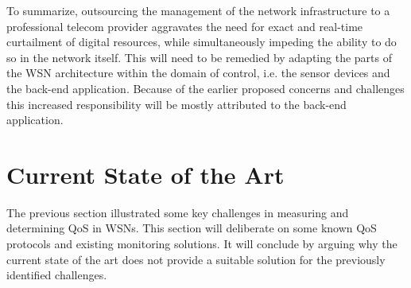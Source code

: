 To summarize, outsourcing the management of the network infrastructure to a professional telecom provider aggravates the need for exact and real-time curtailment of digital resources, while simultaneously impeding the ability to do so in the network itself. This will need to be remedied by adapting the parts of the WSN architecture within the domain of control, i.e. the sensor devices and the back-end application. Because of the earlier proposed concerns and challenges this increased responsibility will be mostly attributed to the back-end application.



\section{Current State of the Art}
The previous section illustrated some key challenges in measuring and determining QoS in WSNs. This section will deliberate on some known QoS protocols and existing monitoring solutions. It will conclude by arguing why the current state of the art does not provide a suitable solution for the previously identified challenges.

